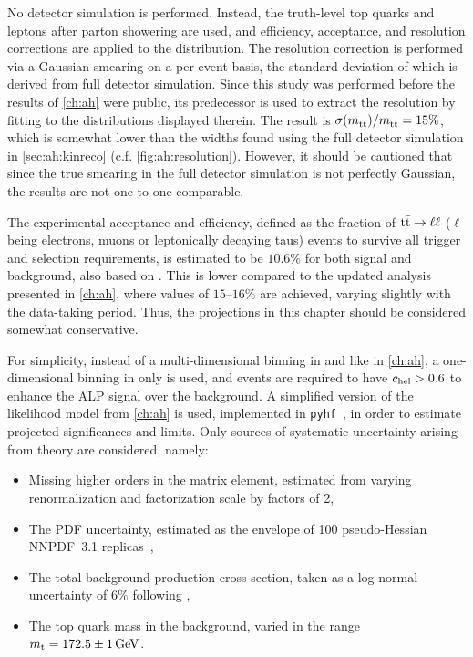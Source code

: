 No detector simulation is performed. Instead, the truth-level top quarks and leptons after parton showering are used, and efficiency, acceptance, and resolution corrections are applied to the \mtt distribution. The resolution correction is performed via a Gaussian smearing on a per-event basis, the standard deviation of which is derived from full detector simulation. Since this study was performed before the results of \cref{ch:ah} were public, its predecessor  is used to extract the resolution by fitting to the \mtt distributions displayed therein. The result is $\sigma(m_{\mathrm{t \bar{t}}}) / m_{\mathrm{t \bar{t}}} = 15\%$, which is somewhat lower than the widths found using the full detector simulation in \cref{sec:ah:kinreco} (c.f. \cref{fig:ah:resolution}). However, it should be cautioned that since the true \mtt smearing in the full detector simulation is not perfectly Gaussian, the results are not one-to-one comparable. 

The experimental acceptance and efficiency, defined as the fraction of $\mathrm{t \bar{t}} \rightarrow \ell\ell$ ($\ell$ being electrons, muons or leptonically decaying taus) events to survive all trigger and selection requirements, is estimated to be $10.6\%$ for both signal and \ttbar background, also based on . This is lower compared to the updated analysis presented in \cref{ch:ah}, where values of $15$--$16\%$ are achieved, varying slightly with the data-taking period. Thus, the projections in this chapter should be considered somewhat conservative.

For simplicity, instead of a multi-dimensional binning in \mtt and \chel like in \cref{ch:ah}, a one-dimensional binning in \mtt only is used, and events are required to have $c_{\mathrm{hel}} > 0.6$ to enhance the ALP signal over the background.
A simplified version of the likelihood model from \cref{ch:ah} is used, implemented in \texttt{pyhf}~\cite{pyhf_joss}, in order to estimate projected significances and limits. Only sources of systematic uncertainty arising from theory are considered, namely:

\begin{itemize}
    \item Missing higher orders in the matrix element, estimated from varying renormalization and factorization scale by factors of 2,
    \item The PDF uncertainty, estimated as the envelope of 100 pseudo-Hessian NNPDF~3.1 replicas~\cite{NNPDF:2017mvq},
    \item The total \ttbar background production cross section, taken as a log-normal uncertainty of $6\%$ following ,
    \item The top quark mass in the \ttbar background, varied in the range $\mt = 172.5 \pm 1 \, \si{\GeV}$.
\end{itemize}

